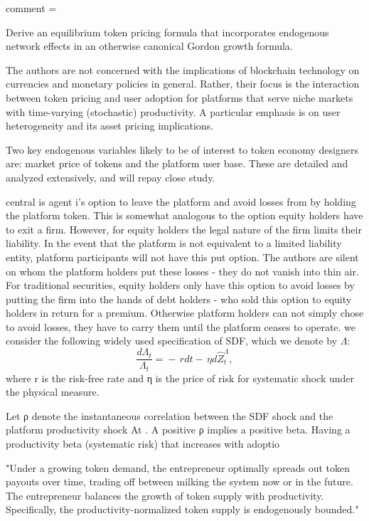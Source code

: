 comment = {Derive an equilibrium token pricing formula that incorporates endogenous network effects in an otherwise canonical Gordon growth formula.

The authors are not concerned with the implications of blockchain technology on currencies and monetary policies in general. Rather, their focus is the interaction between token pricing and user adoption for platforms that serve niche markets with time-varying (stochastic) productivity. A particular emphasis is on user heterogeneity and its asset pricing implications.

Two key endogenous variables likely to be of interest to token economy designers are: market price of tokens and the platform user base.  These are detailed and analyzed extensively, and will repay close study.

central is agent i’s option to leave the platform and avoid losses from by holding the platform token. This is somewhat analogous to the option equity holders have to exit a firm. However, for equity holders the legal nature of the firm limits their liability.  In the event that the platform is not equivalent to a limited liability entity, platform participants will not have this put option. The authors are silent on whom the platform holders put these losses - they do not vanish into thin air. For traditional securities, equity holders only have this option to avoid losses by putting the firm into the hands of debt holders - who sold this option to equity holders in return for a premium.  Otherwise platform holders can not simply chose to avoid losses, they have to carry them until the platform ceases to operate.
we consider the following widely used specification of SDF, which we denote
by $\Lambda$:
\begin{equation}
\frac{d\Lambda_{t}}{\Lambda_{t}}\!=\!-\!\,r d t\!-\!\,\eta d\widehat{Z}_{t}^{\Lambda},
\end{equation}
where r is the risk-free rate and η is the price of risk for systematic shock under the physical measure.

Let ρ denote the instantaneous correlation between the SDF shock and the platform productivity shock At . A positive ρ implies a positive beta.
Having a productivity beta (systematic risk) that increases with adoptio


"Under a growing token demand, the entrepreneur optimally spreads out token payouts over time, trading off between milking the system now or in the future. The entrepreneur balances the growth of token supply with productivity. Specifically, the productivity-normalized token supply is endogenously bounded." 

}
